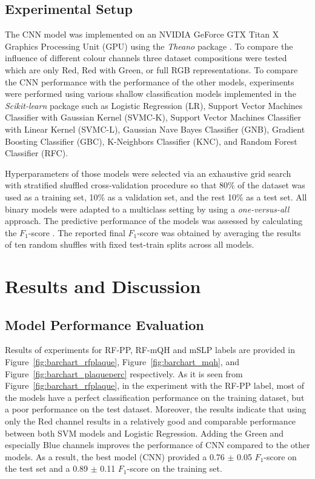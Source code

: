 \documentclass[runningheads,a4paper]{llncs}
\begin{document}
\subsection{Experimental Setup}
The CNN model was implemented on an NVIDIA GeForce GTX Titan X Graphics Processing Unit (GPU) using the \emph{Theano} package \cite{bergstra2011theano}. To compare the influence of different colour channels three dataset compositions were tested which are only Red, Red with Green, or full RGB representations. To compare the CNN performance with the performance of the other models, experiments were performed using various shallow classification models implemented in the \emph{Scikit-learn} package \cite{scikit-learn} such as Logistic Regression (LR), Support Vector Machines Classifier with Gaussian Kernel (SVMC-K), Support Vector Machines Classifier with Linear Kernel (SVMC-L), Gaussian Nave Bayes Classifier (GNB), Gradient Boosting Classifier (GBC), K-Neighbors Classifier (KNC), and Random Forest Classifier (RFC).

Hyperparameters of those models were selected via an exhaustive grid search with stratified shuffled cross-validation procedure so that 80\% of the dataset was used as a training set, 10\% as a validation set, and the rest 10\% as a test set. All binary models were adapted to a multiclass setting by using a \emph{one-versus-all} approach. The predictive performance of the models was assessed by calculating the $F_1$-score \cite{sokolova2009systematic}. The reported final $F_1$-score was obtained by averaging the results of ten random shuffles with fixed test-train splits across all models.

\section{Results and Discussion}
\subsection{Model Performance Evaluation}
Results of experiments for RF-PP, RF-mQH and mSLP labels are provided in Figure~\ref{fig:barchart_rfplaque}, Figure~\ref{fig:barchart_mqh}, and Figure~\ref{fig:barchart_plaqueperc} respectively. As it is seen from Figure~\ref{fig:barchart_rfplaque}, in the experiment with the RF-PP label, most of the models have a perfect classification performance on the training dataset, but a poor performance on the test dataset. Moreover, the results indicate that using only the Red channel results in a relatively good and comparable performance between both SVM models and Logistic Regression. Adding the Green and especially Blue channels improves the performance of CNN compared to the other models. As a result, the best model (CNN) provided a 0.76 $\pm$ 0.05 $F_1$-score on the test set and a 0.89 $\pm$ 0.11 $F_1$-score on the training set.
\end{document}
